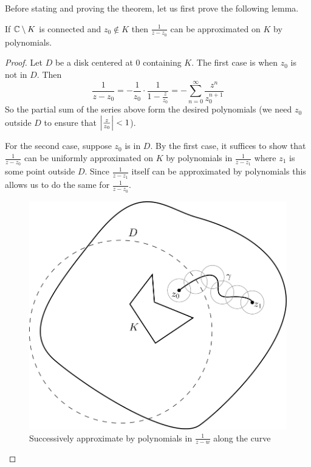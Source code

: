 Before stating and proving the theorem, let us first prove the following lemma.
\begin{lemma}\label{lem:poly-approx-along-curve}
        If $\mathbb{C} \setminus K$ is connected and $z_0 \notin K$ then $\frac{1}{z - z_0}$ can be approximated on $K$ by polynomials.
    \end{lemma}
    \begin{proof}
        Let $D$ be a disk centered at 0 containing $K$. The first case is when $z_0$ is not in $D$. Then
        $$\frac{1}{z - z_0} = -\frac{1}{z_0} \cdot \frac{1}{1 - \frac{z}{z_0}} = - \sum_{n = 0}^\infty \frac{z^n}{z_0^{n + 1}}$$
        So the partial sum of the series above form the desired polynomials (we need $z_0$ outside $D$ to ensure that $\left|\frac{z}{z_0}\right| < 1$).

        For the second case, suppose $z_0$ is in $D$. By the first case, it suffices to show that $\frac{1}{z - z_0}$ can be uniformly approximated on $K$ by polynomials in $\frac{1}{z - z_1}$ where $z_1$ is some point outside $D$. Since $\frac{1}{z - z_1}$ itself can be approximated by polynomials this allows us to do the same for $\frac{1}{z - z_0}$. 

        \begin{figure}
            \centering
            \includegraphics[scale=0.6]{Images/poly_approx_along_curve.png}
            \caption{Successively approximate by polynomials in $\frac{1}{z - w}$ along the curve}
            \label{fig:poly-approx-along-curve}
        \end{figure}
        

\end{proof}
